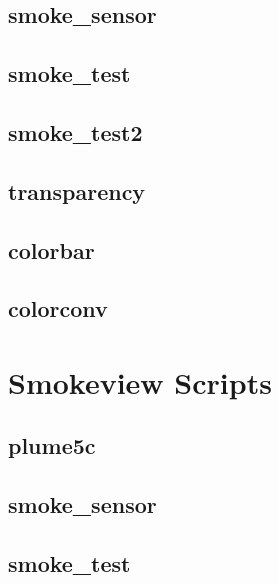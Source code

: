 \documentclass[11pt,twoside]{book}
\newcommand{\fdsinput}[1]{
{
\scriptsize

}
}
\begin{document}
\section{smoke\_sensor}
\label{FDSsmokesensor}
\fdsinput{smoke_sensor.fds}

\section{smoke\_test}
\label{FDSsmoketest}
\fdsinput{smoke_test.fds}

\section{smoke\_test2}
\label{FDSsmoketest2}
\fdsinput{smoke_test2.fds}

\section{transparency}
\label{FDStransparency}
\fdsinput{transparency.fds}

\section{colorbar}
\label{FDScolorbar}
\fdsinput{colorbar.fds}

\section{colorconv}
\label{FDScolorconv}
\fdsinput{colorconv.fds}

\chapter{Smokeview Scripts}
\label{smvscripts}

\section{plume5c}
\label{SSFplume5c}
\fdsinput{plume5c.ssf}

\section{smoke\_sensor}
\label{SSFsmokesensor}
\fdsinput{smoke_sensor.ssf}

\section{smoke\_test}
\label{SSFsmoketest}
\fdsinput{smoke_test.ssf}
\end{document}
